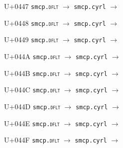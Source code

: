 \documentclass{article}
\begin{document}
\begin{substitutions}
\goodbreak

U+0447  \linebreak
    \texttt{smcp.\textsc{dflt}} $\to$  \linebreak
    \texttt{smcp.cyrl} $\to$  

\goodbreak

U+0448  \linebreak
    \texttt{smcp.\textsc{dflt}} $\to$  \linebreak
    \texttt{smcp.cyrl} $\to$  

\goodbreak

U+0449  \linebreak
    \texttt{smcp.\textsc{dflt}} $\to$  \linebreak
    \texttt{smcp.cyrl} $\to$  

\goodbreak

U+044A  \linebreak
    \texttt{smcp.\textsc{dflt}} $\to$  \linebreak
    \texttt{smcp.cyrl} $\to$  

\goodbreak

U+044B  \linebreak
    \texttt{smcp.\textsc{dflt}} $\to$  \linebreak
    \texttt{smcp.cyrl} $\to$  

\goodbreak

U+044C  \linebreak
    \texttt{smcp.\textsc{dflt}} $\to$  \linebreak
    \texttt{smcp.cyrl} $\to$  

\goodbreak

U+044D  \linebreak
    \texttt{smcp.\textsc{dflt}} $\to$  \linebreak
    \texttt{smcp.cyrl} $\to$  

\goodbreak

U+044E  \linebreak
    \texttt{smcp.\textsc{dflt}} $\to$  \linebreak
    \texttt{smcp.cyrl} $\to$  

\goodbreak

U+044F  \linebreak
    \texttt{smcp.\textsc{dflt}} $\to$  \linebreak
    \texttt{smcp.cyrl} $\to$  


\end{substitutions}
\end{document}
